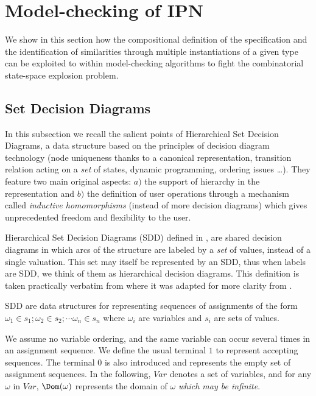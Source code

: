\section{Model-checking of IPN}
\label{ipn-verif}

We show in this section how the compositional definition of
the specification and the identification of similarities through
multiple instantiations of a given type can be exploited to within
model-checking algorithms to fight the combinatorial state-space
explosion problem.

\subsection{Set Decision Diagrams}
\label{sub:set_decision_diagrams}

In this subsection we recall the salient points of Hierarchical Set
Decision Diagrams, a data structure based on the principles of
decision diagram technology (node uniqueness thanks to a canonical
representation, transition relation acting on a \emph{set} of states,
dynamic programming, ordering issues \ldots). They feature two main original
aspects: $a)$ the support of hierarchy in the
representation and $b)$ the definition of user operations through a
mechanism called \emph{inductive homomorphisms} (instead of more
decision diagrams) which gives unprecedented freedom and flexibility
to the user.

Hierarchical Set Decision Diagrams (SDD) defined in \cite{CT05a}, are
shared decision diagrams in which arcs of the structure are labeled by
a \emph{set} of values, instead of a single valuation.  This set may
itself be represented by an SDD, thus when labels are SDD, we think of
them as hierarchical decision diagrams. This definition is taken
practically verbatim from \cite{atpn08saturation} where it was adapted
for more clarity from \cite{CT05a}.

SDD are data structures for representing sequences of assignments of
the form $\omega_1 \in s_1 ;\omega_2 \in s_2; \cdots \omega_n \in s_n$
where $\omega_i$ are variables and $s_i$ are sets of values.

We assume no variable ordering, and the same variable can occur
several times in an assignment sequence. We define the usual
terminal $1$ to represent accepting sequences. The terminal $0$ is
also introduced and represents the empty set of assignment
sequences. In the following, $Var$ denotes a set of variables, and
for any $\omega$ in $Var$, $\Dom(\omega)$ represents the domain of
$\omega$ \emph{which may be infinite}.

